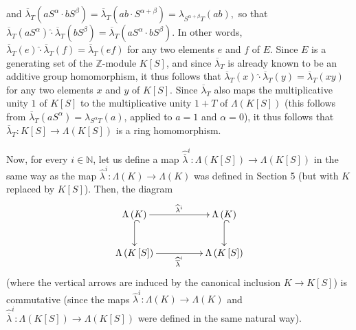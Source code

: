 \documentclass[numbers=enddot,12pt,final,onecolumn,notitlepage]{scrartcl}%
\begin{document}
and $\overline{\lambda}_{T}\left(  aS^{\alpha}\cdot bS^{\beta}\right)
=\overline{\lambda}_{T}\left(  ab\cdot S^{\alpha+\beta}\right)  =\lambda
_{S^{\alpha+\beta}T}\left(  ab\right)  ,$ so that $\overline{\lambda}%
_{T}\left(  aS^{\alpha}\right)  \widehat{\cdot}\overline{\lambda}_{T}\left(
bS^{\beta}\right)  =\overline{\lambda}_{T}\left(  aS^{\alpha}\cdot bS^{\beta
}\right)  $. In other words, $\overline{\lambda}_{T}\left(  e\right)
\widehat{\cdot}\overline{\lambda}_{T}\left(  f\right)  =\overline{\lambda}%
_{T}\left(  ef\right)  $ for any two elements $e$ and $f$ of $E$. Since $E$ is
a generating set of the $\mathbb{Z}$-module $K\left[  S\right]  $, and since
$\overline{\lambda}_{T}$ is already known to be an additive group
homomorphism, it thus follows that $\overline{\lambda}_{T}\left(  x\right)
\widehat{\cdot}\overline{\lambda}_{T}\left(  y\right)  =\overline{\lambda}%
_{T}\left(  xy\right)  $ for any two elements $x$ and $y$ of $K\left[
S\right]  $. Since $\overline{\lambda}_{T}$ also maps the multiplicative unity
$1$ of $K\left[  S\right]  $ to the multiplicative unity $1+T$ of
$\Lambda\left(  K\left[  S\right]  \right)  $ (this follows from
$\overline{\lambda}_{T}\left(  aS^{\alpha}\right)  =\lambda_{S^{\alpha}%
T}\left(  a\right)  $, applied to $a=1$ and $\alpha=0$), it thus follows that
$\overline{\lambda}_{T}:K\left[  S\right]  \rightarrow\Lambda\left(  K\left[
S\right]  \right)  $ is a ring homomorphism.

Now, for every $i\in\mathbb{N}$, let us define a map $\widehat{\overline
{\lambda}}^{i}:\Lambda\left(  K\left[  S\right]  \right)  \rightarrow
\Lambda\left(  K\left[  S\right]  \right)  $ in the same way as the map
$\widehat{\lambda}^{i}:\Lambda\left(  K\right)  \rightarrow\Lambda\left(
K\right)  $ was defined in Section 5 (but with $K$ replaced by $K\left[
S\right]  $). Then, the diagram%
\begin{equation}
\xymatrixcolsep{4pc}\xymatrix{ \Lambda\left(K\right) \ar@{^{(}->}[d] \ar[r]^{\widehat{\lambda}^i} & \Lambda\left(K\right) \ar@{^{(}->}[d] \\ \Lambda\left(K\left[S\right]\right) \ar[r]_{\widehat{\overline{\lambda}}^i} & \Lambda\left(K\left[S\right]\right) }
\label{7.3.commdiag}%
\end{equation}
(where the vertical arrows are induced by the canonical inclusion
$K\rightarrow K\left[  S\right]  $) is commutative (since the maps
$\widehat{\lambda}^{i}:\Lambda\left(  K\right)  \rightarrow\Lambda\left(
K\right)  $ and $\widehat{\overline{\lambda}}^{i}:\Lambda\left(  K\left[
S\right]  \right)  \rightarrow\Lambda\left(  K\left[  S\right]  \right)  $
were defined in the same natural way).
\end{document}
